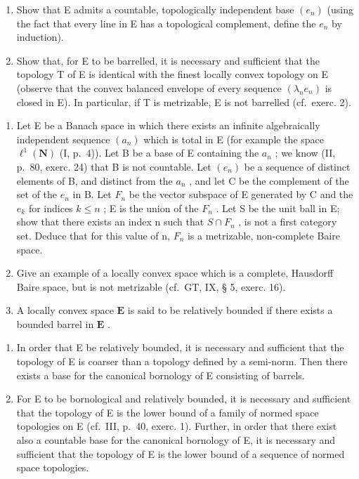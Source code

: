 \begin{enumerate}
\def\labelenumi{\alph{enumi})}
\item
  Show that E admits a countable, topologically independent base \((e_n)\) (using the fact that every line in E has a topological complement, define the \(e_n\) by induction).
\item
  Show that, for E to be barrelled, it is necessary and sufficient that the topology T of E is identical with the finest locally convex topology on E (observe that the convex balanced envelope of every sequence \((\lambda_{n}e_{n})\) is closed in E). In particular, if T is metrizable, E is not barrelled (cf.~exerc. 2).
\end{enumerate}

\begin{enumerate}
\def\labelenumi{\arabic{enumi})}
\setcounter{enumi}{3}
\item
  Let E be a Banach space in which there exists an infinite algebraically independent sequence \((a_{n})\) which is total in E (for example the space \(\ell^{1}(\mathbf{N})\) (I, p.~4)). Let B be a base of E containing the \(a_{n}\) ; we know (II, p.~80, exerc. 24) that B is not countable. Let \((e_{n})\) be a sequence of distinct elements of B, and distinct from the \(a_{n}\) , and let C be the complement of the set of the \(e_{n}\) in B. Let \(F_{n}\) be the vector subspace of E generated by C and the \(e_{k}\) for indices \(k \leqslant n\) ; E is the union of the \(F_{n}\) . Let S be the unit ball in E; show that there exists an index n such that \(S \cap F_{n}\) , is not a first category set. Deduce that for this value of n, \(F_{n}\) is a metrizable, non-complete Baire space.
\item
  Give an example of a locally convex space which is a complete, Hausdorff Baire space, but is not metrizable (cf.~GT, IX, § 5, exerc. 16).
\item
  A locally convex space \(\mathbf{E}\) is said to be relatively bounded if there exists a bounded barrel in \(\mathbf{E}\) .
\end{enumerate}

\begin{enumerate}
\def\labelenumi{\alph{enumi})}
\item
  In order that E be relatively bounded, it is necessary and sufficient that the topology of E is coarser than a topology defined by a semi-norm. Then there exists a base for the canonical bornology of E consisting of barrels.
\item
  For E to be bornological and relatively bounded, it is necessary and sufficient that the topology of E is the lower bound of a family of normed space topologies on E (cf.~III, p.~40, exerc. 1). Further, in order that there exist also a countable base for the canonical bornology of E, it is necessary and sufficient that the topology of E is the lower bound of a sequence of normed space topologies.
\end{enumerate}


